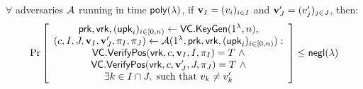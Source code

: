 \begin{definition}
    \label{def:svc:position-binding-security}
    $\forall$ adversaries $\mathcal{A}$ running in time $\mathsf{poly}(\lambda)$, if $\bm{\mathrm{v}}_I=(v_i)_{i\in I}$ and $\bm{\mathrm{v}}'_J=(v'_j)_{j\in J}$, then:
    \begin{align*}
    \Pr \left[ \begin{array}{c}
    \mathsf{prk},\mathsf{vrk},(\mathsf{upk}_i)_{i\in[0,n)} \leftarrow \mathsf{VC}.\mathsf{KeyGen}(1^\lambda, n), \\
    (c,I,J,\bm{\mathrm{v}}_I,\bm{\mathrm{v}}'_J, \pi_I,\pi_J) \leftarrow\mathcal{A}(1^\lambda, \mathsf{prk},\mathsf{vrk},(\mathsf{upk}_i)_{i\in[0,n)}): \\
    \mathsf{VC}.\mathsf{VerifyPos}(\mathsf{vrk}, c, \bm{\mathrm{v}}_I, I, \pi_I) = T\ \wedge \\
    \mathsf{VC}.\mathsf{VerifyPos}(\mathsf{vrk}, c, \bm{\mathrm{v}}'_J, J, \pi_J) = T\ \wedge \\
    \exists k \in I\cap J,\ \text{such that}\ v_k \ne v'_k
    \end{array} \right] \le \mathsf{negl}(\lambda)
    \end{align*}
\end{definition}

